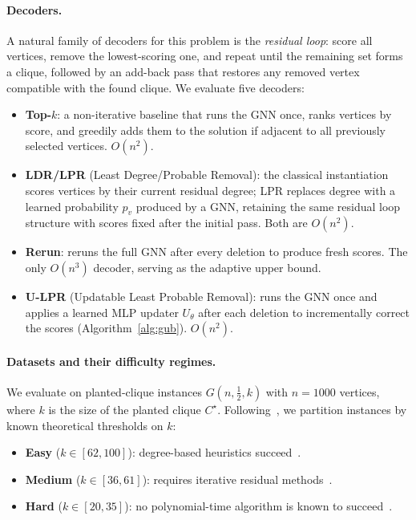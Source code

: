 \documentclass[11pt]{article}
\theoremstyle{plain}
\theoremstyle{remark}
\theoremstyle{plain}
\begin{document}
\paragraph{Decoders.}
A natural family of decoders for this problem is the \emph{residual loop}: score all
vertices, remove the lowest-scoring one, and repeat until the remaining set forms a
clique, followed by an add-back pass that restores any removed vertex compatible with
the found clique. We evaluate five decoders:
\begin{itemize}
  \item \textbf{Top-$k$}: a non-iterative baseline that runs the GNN once, ranks
    vertices by score, and greedily adds them to the solution if adjacent to all
    previously selected vertices. $O(n^2)$.
  \item \textbf{LDR/LPR} (Least Degree/Probable Removal): the classical instantiation
    scores vertices by their current residual degree; LPR replaces degree with a
    learned probability $p_v$ produced by a GNN, retaining the same residual loop
    structure with scores fixed after the initial pass. Both are $O(n^2)$.
  \item \textbf{Rerun}: reruns the full GNN after every deletion to produce fresh
    scores. The only $O(n^3)$ decoder, serving as the adaptive upper bound.
  \item \textbf{U-LPR} (Updatable Least Probable Removal): runs the GNN once and
    applies a learned MLP updater $U_\theta$ after each deletion to incrementally
    correct the scores (Algorithm~\ref{alg:gub}). $O(n^2)$.
\end{itemize}


\paragraph{Datasets and their difficulty regimes.}
We evaluate on planted-clique instances $G(n,\tfrac{1}{2},k)$ with $n=1000$ vertices,
where $k$ is the size of the planted clique $C^\star$. Following~\citet{shoham2026ltr},
we partition instances by known theoretical thresholds on $k$:
\begin{itemize}
  \item \textbf{Easy} ($k\in[62,100]$): degree-based heuristics
    succeed~\citep{kucera1995}.
  \item \textbf{Medium} ($k\in[36,61]$): requires iterative residual
    methods~\citep{alon1998, feige2010}.
  \item \textbf{Hard} ($k\in[20,35]$): no polynomial-time algorithm is known to
    succeed~\citep{manurangsi2021}.
\end{itemize}
\end{document}

